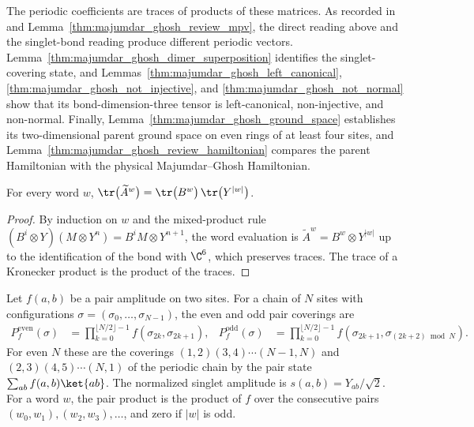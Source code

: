 The periodic coefficients are traces of products of these matrices.
As recorded in \cite{gap:rmp_majumdar_ghosh_tensor_gap} and
Lemma~\ref{thm:majumdar_ghosh_review_mpv}, the direct reading above and the
singlet-bond reading produce different periodic vectors.
Lemma~\ref{thm:majumdar_ghosh_dimer_superposition} identifies the
singlet-covering state, and Lemmas~\ref{thm:majumdar_ghosh_left_canonical},
\ref{thm:majumdar_ghosh_not_injective}, and \ref{thm:majumdar_ghosh_not_normal}
show that its bond-dimension-three tensor is left-canonical, non-injective, and
non-normal. Finally, Lemma~\ref{thm:majumdar_ghosh_ground_space} establishes
its two-dimensional parent ground space on even rings of at least four sites,
and Lemma~\ref{thm:majumdar_ghosh_review_hamiltonian} compares the parent
Hamiltonian with the physical Majumdar--Ghosh Hamiltonian.


\begin{lemma}%
    \label{thm:majumdar_ghosh_review_coeff}
    \leanok
    For every word $w$,
    $\tr\bigl(\widetilde A^{w}\bigr)=\tr\bigl(B^{w}\bigr)\,\tr\bigl(Y^{|w|}\bigr)$.
\end{lemma}

\begin{proof}
    \leanok
    By induction on $w$ and the mixed-product rule
    $(B^i\otimes Y)(M\otimes Y^n)=B^iM\otimes Y^{n+1}$, the word evaluation is
    $\widetilde A^{w}=B^{w}\otimes Y^{|w|}$ up to the identification of the
    bond with $\C^6$, which preserves traces. The trace of a Kronecker product
    is the product of the traces.
\end{proof}

\begin{definition}\label{def:majumdar_ghosh_pair_covering}
    \leanok
    Let $f(a,b)$ be a pair amplitude on two sites. For a chain of $N$ sites
    with configurations $\sigma=(\sigma_0,\ldots,\sigma_{N-1})$, the even and
    odd pair coverings are
    \begin{align}
        P^{\mathrm{even}}_f(\sigma) & = \prod_{k=0}^{\lfloor N/2\rfloor-1}
        f(\sigma_{2k},\sigma_{2k+1}),
                                    &
        P^{\mathrm{odd}}_f(\sigma)  & = \prod_{k=0}^{\lfloor N/2\rfloor-1}
        f(\sigma_{2k+1},\sigma_{(2k+2)\bmod N}).
        \label{eq:mg_pair_covering}
    \end{align}
    For even $N$ these are the coverings $(1,2)(3,4)\cdots(N-1,N)$ and
    $(2,3)(4,5)\cdots(N,1)$ of the periodic chain by the pair state
    $\sum_{ab}f(a,b)\ket{ab}$. The normalized singlet amplitude is
    $s(a,b)=Y_{ab}/\sqrt2$. For a word $w$, the pair product is the product of
    $f$ over the consecutive pairs $(w_0,w_1),(w_2,w_3),\ldots$, and zero if
    $|w|$ is odd.
\end{definition}

